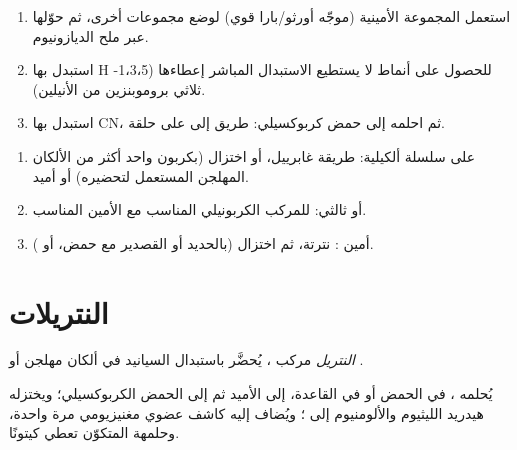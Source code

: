 \begin{method}\label{met:b2:amines:diazonium-routes}
\begin{enumerate}
  \item استعمل المجموعة الأمينية (موجّه أورثو/بارا قوي) لوضع مجموعات أخرى، ثم حوّلها
        عبر ملح الديازونيوم.
  \item استبدل بها H للحصول على أنماط لا يستطيع الاستبدال المباشر إعطاءها
        (1،3،5-ثلاثي بروموبنزين من الأنيلين).
  \item استبدل بها CN، ثم احلمه إلى حمض كربوكسيلي: طريق إلى  على حلقة.
\end{enumerate}
\end{method}

\begin{method}\label{met:b2:amines:make-amine}
\begin{enumerate}
  \item {} على سلسلة ألكيلية: طريقة غابرييل، أو اختزال  (بكربون واحد
        أكثر من الألكان المهلجن المستعمل لتحضيره) أو أميد.
  \item {} أو ثالثي:  للمركب الكربونيلي المناسب مع
        الأمين المناسب.
  \item أمين : نترتة، ثم اختزال (بالحديد أو القصدير مع حمض، أو ).
\end{enumerate}
\end{method}

\section{النتريلات}

\begin{definition}[النتريل]\label{def:b2:amines:nitrile}
\emph{النتريل} مركب ، يُحضَّر باستبدال السيانيد في ألكان مهلجن
أو .
\end{definition}

\begin{proposition}\label{prop:b2:amines:nitrile}
يُحلمه ، في الحمض أو في القاعدة، إلى الأميد ثم إلى الحمض الكربوكسيلي؛ 
ويختزله هيدريد الليثيوم والألومنيوم إلى  ؛ ويُضاف إليه كاشف
عضوي مغنيزيومي مرة واحدة، وحلمهة  المتكوّن تعطي كيتونًا.
\end{proposition}


